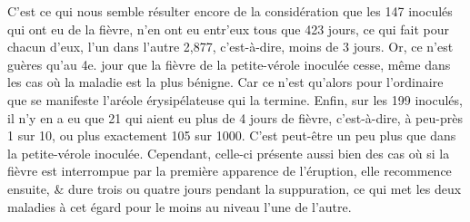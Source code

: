 C'est ce qui nous semble résulter encore de la considération que les 147 inoculés qui ont eu de la fièvre, n'en ont eu entr'eux tous que 423 jours, ce qui fait pour chacun d'eux, l'un dans l'autre 2,877, c'est-à-dire, moins de 3 jours. Or, ce n'est guères qu'au 4e. jour que la fièvre de la petite-vérole inoculée cesse, même dans les cas où la maladie est la plus bénigne. Car ce n'est qu'alors pour l'ordinaire que se manifeste l'aréole érysipélateuse qui la termine. Enfin, sur les 199 inoculés, il n'y en a eu que 21 qui aient eu plus de 4 jours de fièvre, c'est-à-dire, à peu-près 1 sur 10, ou plus exactement 105 sur 1000. C'est peut-être un peu plus que dans la petite-vérole inoculée. Cependant, celle-ci présente aussi bien des cas où si la fièvre est interrompue par la première apparence \setcounter{page}{279} de l'éruption, elle recommence ensuite, & dure trois ou quatre jours pendant la suppuration, ce qui met les deux maladies à cet égard pour le moins au niveau l'une de l'autre.
